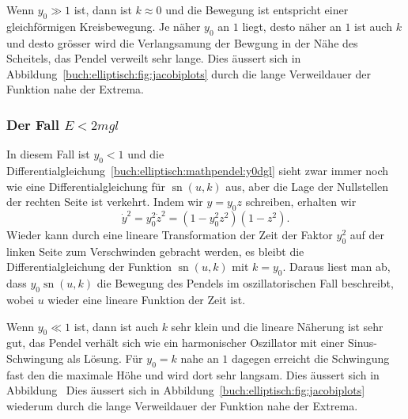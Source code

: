 Wenn $y_0 \gg 1$ ist, dann ist $k\approx 0$ und die Bewegung ist
entspricht einer gleichförmigen Kreisbewegung.
Je näher $y_0$ an $1$ liegt, desto näher an $1$ ist auch $k$ und
desto grösser wird die Verlangsamung der Bewgung in der Nähe des
Scheitels, das Pendel verweilt sehr lange.
Dies äussert sich in Abbildung~\ref{buch:elliptisch:fig:jacobiplots}
durch die lange Verweildauer der Funktion nahe der Extrema.

%
%
\subsubsection{Der Fall $E<2mgl$}
In diesem Fall ist $y_0<1$ und die
Differentialgleichung~\eqref{buch:elliptisch:mathpendel:y0dgl}
sieht zwar immer noch wie eine Differentialgleichung für
$\operatorname{sn}(u,k)$ aus, aber die Lage der Nullstellen
der rechten Seite ist verkehrt.
Indem wir $y=y_0z$ schreiben, erhalten wir 
\begin{equation}
\dot{y}^2
=
y_0^2 \dot{z}^2
=
(1-y_0^2z^2)(1-z^2).
\end{equation}
Wieder kann durch eine lineare Transformation der Zeit der Faktor $y_0^2$
auf der linken Seite zum Verschwinden gebracht werden, es bleibt
die Differentialgleichung der Funktion $\operatorname{sn}(u,k)$
mit $k=y_0$.
Daraus liest man ab, dass $y_0\operatorname{sn}(u,k)$ die Bewegung
des Pendels im oszillatorischen Fall beschreibt, wobei $u$ wieder
eine lineare Funktion der Zeit ist.

Wenn $y_0\ll 1$ ist, dann ist auch $k$ sehr klein und die lineare
Näherung ist sehr gut, das Pendel verhält sich wie ein harmonischer
Oszillator mit einer Sinus-Schwingung als Lösung.
Für $y_0=k$ nahe an $1$ dagegen erreicht die Schwingung fast den
die maximale Höhe und wird dort sehr langsam.
Dies äussert sich in Abbildung~
Dies äussert sich in Abbildung~\ref{buch:elliptisch:fig:jacobiplots}
wiederum durch die lange Verweildauer der Funktion nahe der Extrema.

